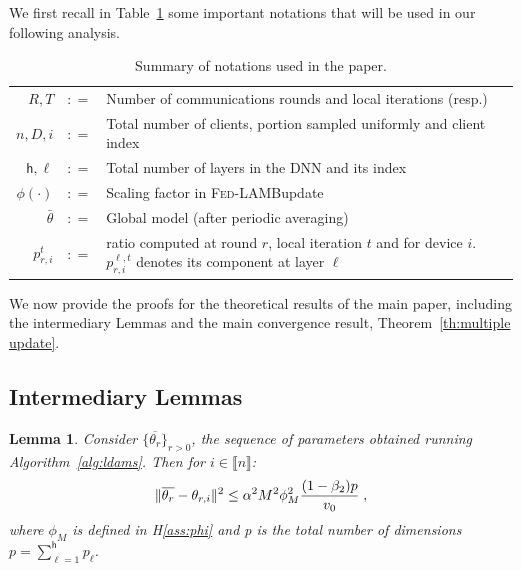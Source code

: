\documentclass[11pt]{article}
\newtheorem*{Lemma*}{Lemma}
\newcommand{\eqsp}{\;}
\newcommand{\beq}{\begin{equation}}
\newcommand{\eeq}{\end{equation}}
\newcommand{\eqdef}{\mathrel{\mathop:}=}
\newcommand{\inter}{\llbracket n \rrbracket}
\def\tot{\mathsf{h}}
\newcommand{\algo}{\textsc{Fed-LAMB}}
\begin{document}
We first recall in Table~\ref{tab:notationsapp} some important notations that will be used in our following analysis.
\begin{table}[H]
\begin{center}%
\begin{tabular}{r c p{12cm} }
\toprule
$R, T$ & $\eqdef$ &  Number of communications rounds and local iterations (resp.)\\
$n, D, i$ & $\eqdef$ &  Total number of clients, portion sampled uniformly and client index \\
$\tot, \ell$ & $\eqdef$ &  Total number of layers in the DNN and its index \\
$\phi(\cdot)$ & $\eqdef$ &  Scaling factor in \algo update\\
$\bar{\theta}$ & $\eqdef$ &  Global model (after periodic averaging)\\
$p_{r,i}^{t}$ & $\eqdef$ &  ratio computed at round $r$, local iteration $t$ and for device $i$. $p_{r,i}^{\ell,t}$ denotes its component at layer $\ell$\\
\bottomrule
\end{tabular}
\end{center}
\caption{Summary of notations used in the paper.}
\label{tab:notationsapp}
\end{table}


We now provide the proofs for the theoretical results of the main paper, including the intermediary Lemmas and the main convergence result, Theorem~\ref{th:multiple update}.


\subsection{Intermediary Lemmas}


\begin{Lemma*}
Consider $\{\overline{\theta_r}\}_{r>0}$, the sequence of parameters obtained running Algorithm~\ref{alg:ldams}. Then for $i \in \inter$:
\beq\notag
\| \overline{\theta_r} - \theta_{r,i} \|^2 \leq \alpha^2 M^2 \phi_M^2 \frac{(1-\beta_2)p}{v_0} \eqsp,
\eeq
where $\phi_M$ is defined in H\ref{ass:phi} and p is the total number of dimensions $p = \sum_{\ell = 1}^\tot p_\ell$.
\end{Lemma*}
\end{document}
